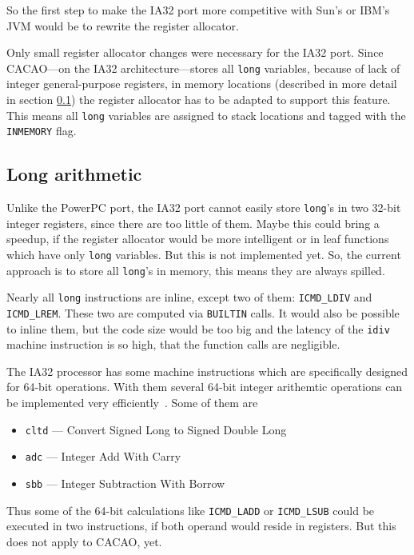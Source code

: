 So the first step to make the IA32 port more competitive with Sun's or
IBM's JVM would be to rewrite the register allocator.

Only small register allocator changes were necessary for the IA32
port. Since CACAO---on the IA32 architecture---stores all
\texttt{long} variables, because of lack of integer general-purpose
registers, in memory locations (described in more detail in section
\ref{sectionia32longarithmetic}) the register allocator has to be
adapted to support this feature. This means all \texttt{long}
variables are assigned to stack locations and tagged with the
\texttt{INMEMORY} flag.


\subsection{Long arithmetic}
\label{sectionia32longarithmetic}

Unlike the PowerPC port, the IA32 port cannot easily store
\texttt{long}'s in two 32-bit integer registers, since there are too
little of them. Maybe this could bring a speedup, if the register
allocator would be more intelligent or in leaf functions which have
only \texttt{long} variables. But this is not implemented yet. So, the
current approach is to store all \texttt{long}'s in memory, this means
they are always spilled.

Nearly all \texttt{long} instructions are inline, except two of them:
\texttt{ICMD\_LDIV} and \texttt{ICMD\_LREM}. These two are computed
via \texttt{BUILTIN} calls. It would also be possible to inline them,
but the code size would be too big and the latency of the
\texttt{idiv} machine instruction is so high, that the function calls
are negligible.

The IA32 processor has some machine instructions which are
specifically designed for 64-bit operations. With them several 64-bit
integer arithemtic operations can be implemented very
efficiently~\cite{AMDopt}. Some of them are

\begin{itemize}
 \item \texttt{cltd} --- Convert Signed Long to Signed Double Long
 \item \texttt{adc} --- Integer Add With Carry
 \item \texttt{sbb} --- Integer Subtraction With Borrow
\end{itemize}

Thus some of the 64-bit calculations like \texttt{ICMD\_LADD} or
\texttt{ICMD\_LSUB} could be executed in two instructions, if both
operand would reside in registers. But this does not apply to CACAO,
yet.

